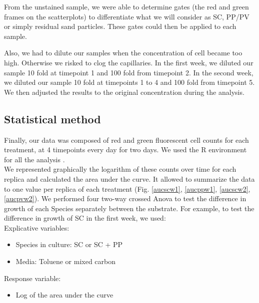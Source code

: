 \documentclass[a4paper, 10pt, conference]{ieeeconf}   %
\begin{document}
From the unstained sample, we were able to determine gates (the red and green frames on the scatterplots) to differentiate what we will consider as SC, PP/PV or simply residual sand particles. These gates could then be applied to each sample.

Also, we had to dilute our samples when the concentration of cell became too high. Otherwise we risked to clog the capillaries.
In the first week, we diluted our sample 10 fold at timepoint 1 and 100 fold from timepoint 2. In the second week, we diluted our sample 10 fold at timepoints 1 to 4 and 100 fold from timepoint 5.
We then adjusted the results to the original concentration during the analysis. 


\subsection{Statistical method}
Finally, our data was composed of red and green fluorescent cell counts for each treatment, at 4 timepoints every day for two days. We used the R environment for all the analysis \cite{R}.\\
We represented graphically the logarithm of these counts over time for each replica and calculated the area under the curve. It allowed to summarize the data to one value per replica of each treatment (Fig. \ref{aucscw1}, \ref{aucppw1}, \ref{aucscw2}, \ref{aucpvw2}).
We performed four two-way crossed Anova to test the difference in growth of each Species separately between the substrate. For example, to test the difference in growth of SC in the first week, we used: \\
Explicative variables:
\begin{itemize}
	\item Species in culture: SC or SC + PP
	\item Media: Toluene or mixed carbon
\end{itemize}
Response variable:
\begin{itemize}
	\item Log of the area under the curve
\end{itemize}
\end{document}
